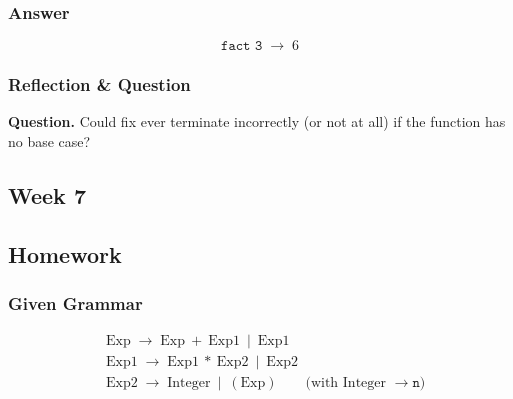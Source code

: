 \documentclass{article}
\theoremstyle{theorem}
\theoremstyle{definition}
\theoremstyle{remark}
\begin{document}
\subsubsection*{Answer}
\[
\boxed{\texttt{fact 3} \;\to\; 6}
\]

\subsubsection*{Reflection \& Question}
\textbf{Question.} Could fix ever terminate incorrectly (or not at all) if the function has no base case?

\subsection{Week 7}\label{sec:week7}
\smallskip
\subsection*{Homework}
\subsubsection*{Given Grammar}
\[
\begin{aligned}
&\text{Exp} \;\to\; \text{Exp}~{+}~\text{Exp1}\ \mid\ \text{Exp1}\\
&\text{Exp1} \;\to\; \text{Exp1}~{*}~\text{Exp2}\ \mid\ \text{Exp2}\\
&\text{Exp2} \;\to\; \text{Integer}\ \mid\ (\text{Exp}) \qquad\text{(with Integer } \to \texttt{n})
\end{aligned}
\]
\end{document}
